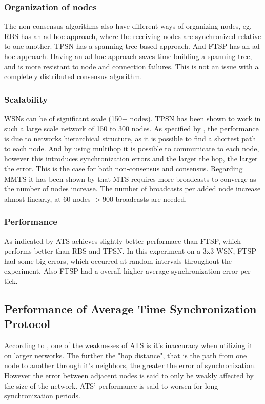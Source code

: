 \documentclass[a4paper,12pt]{article}
\begin{document}
\subsubsection{Organization of nodes} The non-consensus algorithms also have different ways of organizing nodes, eg. RBS has an ad hoc approach, where the receiving nodes are synchronized relative to one another. TPSN has a spanning tree based approach. And FTSP has an ad hoc approach. Having an ad hoc approach saves time building a spanning tree, and is more resistant to node and connection failures. This is not an issue with a completely distributed consensus algorithm.

\subsubsection{Scalability}

WSNs can be of significant scale (150+ nodes). TPSN has been shown to work in such a large scale network of 150 to 300 nodes. As specified by \citet{GaneriwalEtAl03}, the performance is due to networks hierarchical structure, as it is possible to find a shortest path to each node. And by using multihop it is possible to communicate to each node, however this introduces synchronization errors and the larger the hop, the larger the error. This is the case for both non-consensus and consensus. Regarding MMTS it has been shown by \citet{HeLiChenCheng13} that MTS requires more broadcasts to converge as the number of nodes increase. The number of broadcasts per added node increase almost linearly, at 60 nodes $>900$ broadcasts are needed. 

\subsubsection{Performance}

As indicated by \citet{LucaFiorentin11} ATS achieves slightly better performace than FTSP, which performs better than RBS and TPSN. In this experiment on a 3x3 WSN, FTSP had some big errors, which occurred at random intervals throughout the experiment. Also FTSP had a overall higher average synchronization error per tick.

\subsection{Performance of Average Time Synchronization Protocol} 

According to \citet{LucaFiorentin11}, one of the weaknesses of ATS is it's inaccuracy when utilizing it on larger networks. The further the "hop distance", that is the path from one node to another through it's neighbors, the greater the error of synchronization. However the error between adjacent nodes is said to only be weakly affected by the size of the network. ATS' performance is said to worsen for long synchronization periods.
\end{document}
